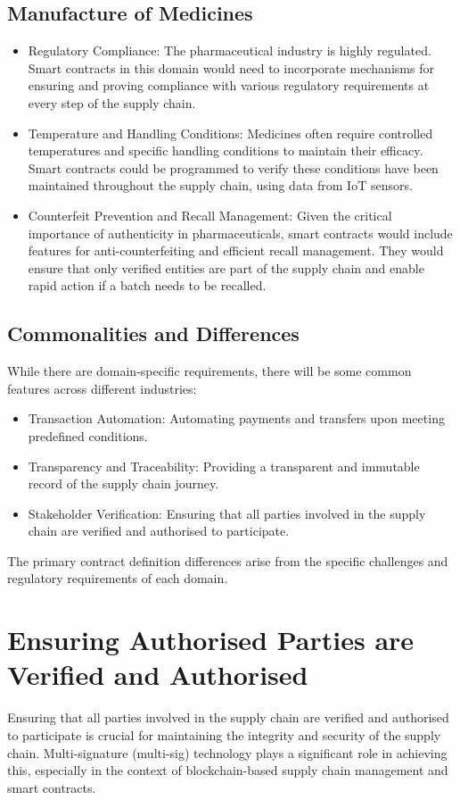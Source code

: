 \documentclass{tufte-handout}
\begin{document}
\subsection{Manufacture of Medicines}\label{sec:page-layout}
\begin{itemize}
    \item Regulatory Compliance: The pharmaceutical industry is highly regulated. Smart contracts in this domain would need to incorporate
    mechanisms for ensuring and proving compliance with various regulatory requirements at every step of the supply chain.
    \item Temperature and Handling Conditions: Medicines often require controlled temperatures and specific handling conditions to maintain
    their efficacy. Smart contracts could be programmed to verify these conditions have been maintained throughout the supply chain,
    using data from IoT sensors.
    \item Counterfeit Prevention and Recall Management: Given the critical importance of authenticity in pharmaceuticals, smart contracts
    would include features for anti-counterfeiting and efficient recall management. They would ensure that only verified entities are part
    of the supply chain and enable rapid action if a batch needs to be recalled.
\end{itemize}

\subsection{Commonalities and Differences}\label{sec:page-layout}
While there are domain-specific requirements, there will be some common features across different industries:

\begin{itemize}
    \item Transaction Automation: Automating payments and transfers upon meeting predefined conditions.
    \item Transparency and Traceability: Providing a transparent and immutable record of the supply chain journey.
    \item Stakeholder Verification: Ensuring that all parties involved in the supply chain are verified and authorised to participate.
\end{itemize}

The primary contract definition differences arise from the specific challenges and regulatory requirements of each domain. 

\section{Ensuring Authorised Parties are Verified and Authorised}\label{sec:page-layout}
Ensuring that all parties involved in the supply chain are verified and authorised to participate is crucial for maintaining the integrity
and security of the supply chain. Multi-signature (multi-sig) technology plays a significant role in achieving this, especially in
the context of blockchain-based supply chain management and smart contracts.
\end{document}
